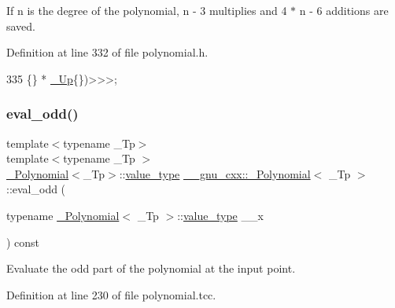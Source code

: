 If n is the degree of the polynomial, n -\/ 3 multiplies and 4 $\ast$ n -\/ 6 additions are saved. 

Definition at line 332 of file polynomial.\+h.


\begin{DoxyCode}
335                                                             \{\} * \hyperlink{class____gnu__cxx_1_1__Polynomial_a242114d4b86648a5dff67a8221f80d40}{\_Up}\{\})>>>;
\end{DoxyCode}
\mbox{\label{class____gnu__cxx_1_1__Polynomial_acd4fd2288b7dd7a5933e84ae372d4769}} 
\subsubsection{\texorpdfstring{eval\+\_\+odd()}{eval\_odd()}\hspace{0.1cm}{\footnotesize\ttfamily [1/3]}}
{\footnotesize\ttfamily template$<$typename \+\_\+\+Tp$>$ \\
template$<$typename \+\_\+\+Tp $>$ \\
\hyperlink{class____gnu__cxx_1_1__Polynomial}{\+\_\+\+Polynomial}$<$\+\_\+\+Tp$>$\+::\hyperlink{class____gnu__cxx_1_1__Polynomial_a725563351f50e76084a7a016c06f8a53}{value\+\_\+type} \hyperlink{class____gnu__cxx_1_1__Polynomial}{\+\_\+\+\_\+gnu\+\_\+cxx\+::\+\_\+\+Polynomial}$<$ \+\_\+\+Tp $>$\+::eval\+\_\+odd (\begin{DoxyParamCaption}\item[{typename \hyperlink{class____gnu__cxx_1_1__Polynomial}{\+\_\+\+Polynomial}$<$ \+\_\+\+Tp $>$\+::\hyperlink{class____gnu__cxx_1_1__Polynomial_a725563351f50e76084a7a016c06f8a53}{value\+\_\+type}}]{\+\_\+\+\_\+x }\end{DoxyParamCaption}) const}

Evaluate the odd part of the polynomial at the input point. 

Definition at line 230 of file polynomial.\+tcc.


